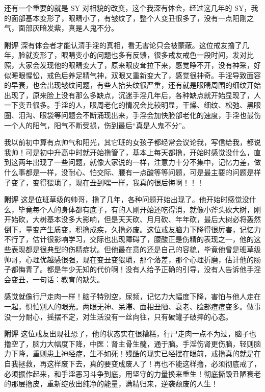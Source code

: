 \begin{case}[变丑]
    还有一个重要的就是 SY 对相貌的改变，这个我深有体会，经过这几年的 SY，我的面部基本变形了，眼睛小了，有皱纹了，整个人变丑很多了，没有一点阳刚之气，面部灰暗发紫，真是人鬼不分。

    \textbf{附评} 深有体会者才能认清手淫的真相，看无害论只会被蒙蔽。这位戒友撸了几年，脸就变形了，眼睛变小的问题也多有反馈，很多戒友戒色一段时间，发对比照，大家会发现他的眼睛变大了，原来眼皮耷拉下来，感觉睁不开，没有神采，好似睡眼惺忪，戒色后养足精气神，双眼又重新变大了，感觉很神奇。手淫导致面容的早衰，也会出现皱纹问题，有些人抬头纹很严重，还有就是眼睛周围的细纹开始出现了，原来脸上没有那么多缺点，沉迷手淫几年后，各种缺点就开始显现了，人一下变丑很多。手淫的人，眼周老化的情况会比较明显，干燥、细纹、松弛、黑眼圈、泪沟、眼袋等问题会不断涌现出来，手淫会加快脸部老化的速度，手淫也最伤一个人的阳气，阳气不断受损，伤到最后“真是人鬼不分”。
\end{case}

\begin{case}[变丑]
    我以前初中算有点帅气和阳光，其它班的女孩子都经常会议论我，写信给我，都说我帅！可是初中升高中时就开始撸管了，基本上每天都撸，开始时感觉没什么，直到这两年出现了一些问题，就像大家说的一样，注意力十分不集中，记忆力差，做什么事都是一样，没耐心、怕交际、腰有一点酸等等问题，可是最主要的问题是样子变了，变得猥琐了，现在丑到嘿一样，我真的很后悔啊！！！

    \textbf{附评} 这是位班草级的帅哥，撸了几年，各种问题开始出现了。他开始时感觉没什么，毕竟每个人的身体都有底子，有的人刚开始还吃得消，就像小斧头砍大树，刚开始砍，大树基本没多大影响，但是天天砍、月月砍、年年砍，最后大树必将轰然倒下，量变产生质变，积撸成疾，久撸必废。这位戒友脑力下降得很厉害，记忆力不行了，估计很影响学习，交际也出现障碍了，腰酸正是伤精的表现之一，他的这些表现都是很典型的伤精症状。但他最在意的还是自己的容貌，毕竟他曾是班草级帅哥，心理优越感很强，现在变丑变猥琐，那个落差，那个心理折磨，估计他的肠子都悔青了。都是年少无知的代价啊！没有人给予正确的引导，没有人告诉他手淫会变丑，一句话：教育的缺失。
\end{case}

\begin{case}[变丑]
    感觉就像行尸走肉一样！脑子特别空，尿频，记忆力大幅度下降，害怕与他人走在一起，惧怕别人的眼光。两眼无神、呆滞、面相丑陋、衰老、脸部痘痘变多。做事没一分耐心，摇摆不定，对生活没有一丝向往，只有破罐子破摔的心态。

    \textbf{附评} 这位戒友出现社恐了，他的状态实在很糟糕，行尸走肉一点不为过，脑子也撸空了，脑力大幅度下降，中医：肾主骨生髓，通于脑。手淫伤肾更伤脑，轻则脑力下降，重则患上神经症，生不如死！残酷的现实已经摆在眼前，戒撸真的就是在自我拯救，再这样废下去，真的要变成废人了！再也不能这样撸，必须彻底戒了，必须振作起来，和手淫恶习斗争到底，用坚守的力量换来重生！彻底撕毁丑陋衰老的那层撸皮，重新绽放出纯净的能量，满精归来，逆袭颓废的人生！
\end{case}

